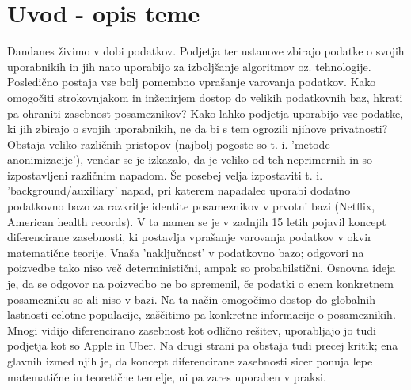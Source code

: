 \documentclass[mat1]{article}
\theoremstyle{definition}
\begin{document}
\section{Uvod - opis teme}
Dandanes živimo v dobi podatkov. Podjetja ter ustanove zbirajo podatke o svojih uporabnikih in jih nato uporabijo za izboljšanje algoritmov oz. tehnologije. Posledično postaja vse bolj pomembno  vprašanje  varovanja podatkov. Kako omogočiti strokovnjakom in inženirjem dostop do velikih podatkovnih baz, hkrati pa ohraniti zasebnost posameznikov? Kako lahko podjetja uporabijo vse podatke, ki jih zbirajo o svojih uporabnikih, ne da bi s tem ogrozili njihove privatnosti? Obstaja veliko različnih pristopov (najbolj pogoste so t. i. 'metode anonimizacije'), vendar se je izkazalo, da je veliko od teh neprimernih in so izpostavljeni različnim napadom. Še posebej velja izpostaviti t. i. 'background/auxiliary' napad, pri katerem napadalec uporabi dodatno podatkovno bazo za razkritje identite posameznikov v prvotni bazi (Netflix, American health records).  V ta namen se je v zadnjih 15 letih pojavil koncept diferencirane zasebnosti, ki postavlja vprašanje varovanja podatkov v okvir matematične teorije. Vnaša 'naključnost' v podatkovno bazo; odgovori na poizvedbe tako niso več deterministični, ampak so probabilstični. Osnovna ideja je, da se odgovor na poizvedbo ne bo spremenil, če podatki o enem konkretnem posamezniku so ali niso v bazi. Na ta način omogočimo dostop do globalnih lastnosti celotne populacije, zaščitimo pa konkretne informacije o posameznikih. Mnogi vidijo diferencirano zasebnost kot odlično rešitev, uporabljajo jo tudi podjetja kot so Apple in Uber. Na drugi strani pa obstaja tudi precej kritik; ena glavnih izmed njih je, da koncept diferencirane zasebnosti sicer ponuja lepe matematične in teoretične temelje, ni pa zares uporaben v praksi. 
\newline
\newline
\end{document}
